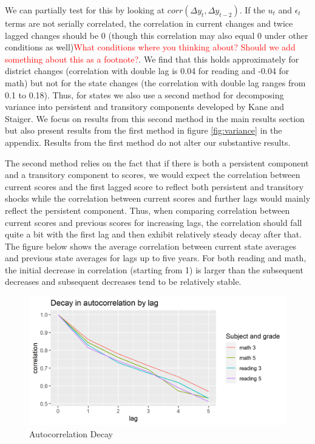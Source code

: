 \documentclass[
  11pt,
]{article}
\begin{document}
We can partially test for this by looking at \(corr(\Delta y_{t}, \Delta y_{t-2})\). If the \(u_{t}\) and \(\epsilon_{t}\) terms are not serially correlated, the correlation in current changes and twice lagged changes should be 0 (though this correlation may also equal 0 under other conditions as well)\textcolor{red}{What conditions where you thinking about? Should we add something about this as a footnote?}. We find that this holds approximately for district changes (correlation with double lag is 0.04 for reading and -0.04 for math) but not for the state changes (the correlation with double lag ranges from 0.1 to 0.18). Thus, for states we also use a second method for decomposing variance into persistent and transitory components developed by Kane and Staiger. We focus on results from this second method in the main results section but also present results from the first method in figure \ref{fig:variance} in the appendix. Results from the first method do not alter our substantive results.

The second method relies on the fact that if there is both a persistent component and a transitory component to scores, we would expect the correlation between current scores and the first lagged score to reflect both persistent and transitory shocks while the correlation between current scores and further lags would mainly reflect the persistent component. Thus, when comparing correlation between current scores and previous scores for increasing lags, the correlation should fall quite a bit with the first lag and then exhibit relatively steady decay after that. The figure below shows the average correlation between current state averages and previous state averages for lags up to five years. For both reading and math, the initial decrease in correlation (starting from 1) is larger than the subsequent decreases and subsequent decreases tend to be relatively stable.

\begin{figure}

{\centering \includegraphics[width=0.8\linewidth]{Correlation decay} 

}

\caption{Autocorrelation Decay}\label{fig:decay}
\end{figure}
\end{document}

